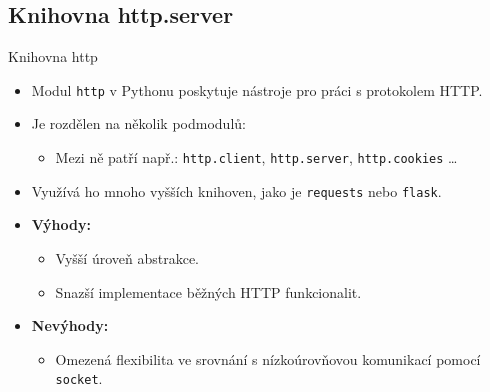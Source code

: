 \documentclass{beamer}
\begin{document}
\subsection{Knihovna http.server}
\begin{frame}{Knihovna http}
	\begin{itemize}
		\item Modul \texttt{http} v Pythonu poskytuje nástroje pro práci s protokolem HTTP.
		\item Je rozdělen na několik podmodulů:
		\begin{itemize}
			\item Mezi ně patří např.: \texttt{http.client}, \texttt{http.server}, \texttt{http.cookies} \ldots
		\end{itemize}
		\item Využívá ho mnoho vyšších knihoven, jako je \texttt{requests} nebo \texttt{flask}.
		\item \textbf{Výhody:}
		\begin{itemize}
			\item Vyšší úroveň abstrakce.
			\item Snazší implementace běžných HTTP funkcionalit.
		\end{itemize}
		\item \textbf{Nevýhody:}
		\begin{itemize}
			\item Omezená flexibilita ve srovnání s nízkoúrovňovou komunikací pomocí \texttt{socket}.
		\end{itemize}
	\end{itemize}	
\end{frame}
\end{document}
